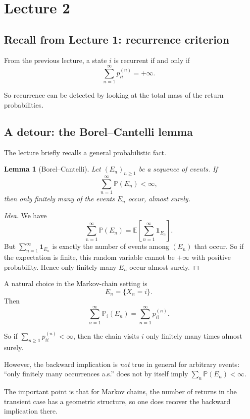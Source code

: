 \documentclass[11pt]{article}
\newtheorem{lemma}[theorem]{Lemma}
\theoremstyle{definition}
\begin{document}
\clearpage
\section{Lecture 2}

\subsection{Recall from Lecture 1: recurrence criterion}

From the previous lecture, a state \(i\) is recurrent if and only if
\[
\sum_{n=1}^\infty p_{ii}^{(n)}=+\infty.
\]

So recurrence can be detected by looking at the total mass of the return probabilities.

\subsection{A detour: the Borel--Cantelli lemma}

The lecture briefly recalls a general probabilistic fact.

\begin{lemma}[Borel--Cantelli]
Let \((E_n)_{n\ge 1}\) be a sequence of events. If
\[
\sum_{n=1}^\infty \mathbb P(E_n)<\infty,
\]
then only finitely many of the events \(E_n\) occur, almost surely.
\end{lemma}

\begin{proof}[Idea]
We have
\[
\sum_{n=1}^\infty \mathbb P(E_n)
=
\mathbb E\!\left[\sum_{n=1}^\infty \mathbf 1_{E_n}\right].
\]
But \(\sum_{n=1}^\infty \mathbf 1_{E_n}\) is exactly the number of events among \((E_n)\) that occur. So if the expectation is finite, this random variable cannot be \(+\infty\) with positive probability. Hence only finitely many \(E_n\) occur almost surely.
\end{proof}

A natural choice in the Markov-chain setting is
\[
E_n=\{X_n=i\}.
\]
Then
\[
\sum_{n=1}^\infty \mathbb P_i(E_n)
=
\sum_{n=1}^\infty p_{ii}^{(n)}.
\]

So if \(\sum_{n\ge 1} p_{ii}^{(n)}<\infty\), then the chain visits \(i\) only finitely many times almost surely.

However, the backward implication is \emph{not} true in general for arbitrary events: ``only finitely many occurrences a.s.'' does not by itself imply \(\sum_n \mathbb P(E_n)<\infty\).

The important point is that for Markov chains, the number of returns in the transient case has a geometric structure, so one does recover the backward implication there.
\end{document}
